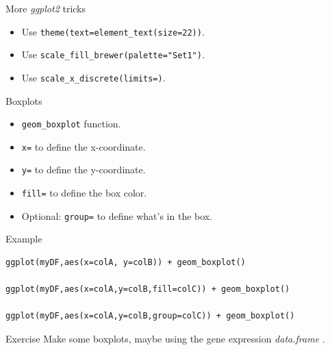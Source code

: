 \documentclass[10pt]{beamer}
\newcommand{\df}{{\it data.frame} }
\begin{document}
\begin{frame}[fragile]{More {\it ggplot2} tricks}
  \begin{itemize}
  \item Use \verb!theme(text=element_text(size=22))!.
  \item Use \verb!scale_fill_brewer(palette="Set1")!.
  \item Use \verb!scale_x_discrete(limits=)!.
  \end{itemize}
\end{frame}

\begin{frame}[fragile]{Boxplots}
  \begin{block}{}
    \begin{itemize}
    \item \verb!geom_boxplot! function.
    \item \verb!x=! to define the x-coordinate.
    \item \verb!y=! to define the y-coordinate.
      \bigskip
    \item \verb!fill=! to define the box color.
    \item Optional: \verb!group=! to define what's in the box.
    \end{itemize}
  \end{block}
  \begin{exampleblock}{Example}
\begin{verbatim}
ggplot(myDF,aes(x=colA, y=colB)) + geom_boxplot()

ggplot(myDF,aes(x=colA,y=colB,fill=colC)) + geom_boxplot()

ggplot(myDF,aes(x=colA,y=colB,group=colC)) + geom_boxplot()
\end{verbatim}
  \end{exampleblock}
  \begin{alertblock}{Exercise}
    Make some boxplots, maybe using the gene expression \df.
  \end{alertblock}
\end{frame}
\end{document}
